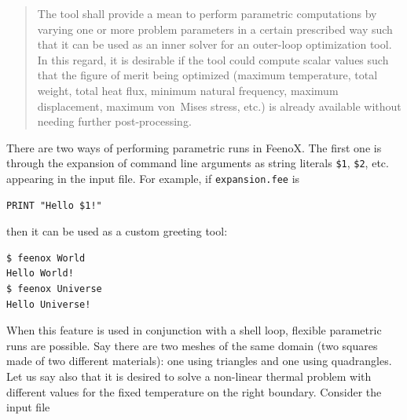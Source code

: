 \documentclass[
  american,
]{article}
\begin{document}
\begin{quote}
The tool shall provide a mean to perform parametric computations by
varying one or more problem parameters in a certain prescribed way such
that it can be used as an inner solver for an outer-loop optimization
tool. In this regard, it is desirable if the tool could compute scalar
values such that the figure of merit being optimized (maximum
temperature, total weight, total heat flux, minimum natural frequency,
maximum displacement, maximum von~Mises stress, etc.) is already
available without needing further post-processing.
\end{quote}

There are two ways of performing parametric runs in FeenoX. The first
one is through the expansion of command line arguments as string
literals \passthrough{\lstinline!$1!}, \passthrough{\lstinline!$2!},
etc. appearing in the input file. For example, if
\passthrough{\lstinline!expansion.fee!} is

\begin{lstlisting}[style=feenox]
PRINT "Hello $1!"
\end{lstlisting}

\noindent then it can be used as a custom greeting tool:

\begin{lstlisting}[style=terminal]
$ feenox World
Hello World!
$ feenox Universe
Hello Universe!
\end{lstlisting}

When this feature is used in conjunction with a shell loop, flexible
parametric runs are possible. Say there are two meshes of the same
domain (two squares made of two different materials): one using
triangles and one using quadrangles. Let us say also that it is desired
to solve a non-linear thermal problem with different values for the
fixed temperature on the right boundary. Consider the input file
\end{document}
